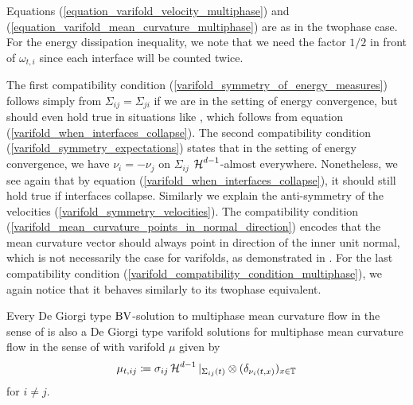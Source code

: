 Equations (\ref{equation_varifold_velocity_multiphase}) and 
(\ref{equation_varifold_mean_curvature_multiphase}) are as in the twophase 
case. For the energy dissipation inequality, we note that we need the factor $ 
1/2 $ in front of $ \omega_{ t , i } $ since each interface will be counted 
twice. 

The first compatibility condition (\ref{varifold_symmetry_of_energy_measures}) 
follows simply from $ \Sigma_{ i j } = \Sigma_{ j i } $ if we are in the 
setting of energy convergence, but should even hold true in situations like 
, which follows from equation 
(\ref{varifold_when_interfaces_collapse}). The second compatibility condition 
(\ref{varifold_symmetry_expectations}) states that in the setting of energy 
convergence, we have $ \nu_{ i } = - \nu_{ j } $ on $ \Sigma_{ i j } $ $ \operatorname{\mathcal{H}}^{ 
d -1 } $-almost everywhere. Nonetheless, we see again that by equation 
(\ref{varifold_when_interfaces_collapse}), it should still hold true if 
interfaces collapse. Similarly we explain the anti-symmetry of the velocities 
(\ref{varifold_symmetry_velocities}). The compatibility condition 
(\ref{varifold_mean_curvature_points_in_normal_direction}) encodes that the 
mean curvature vector should always point in direction of the inner unit 
normal, which is not necessarily the case for varifolds, as demonstrated in 
.
For the last compatibility condition 
(\ref{varifold_compatibility_condition_multiphase}), we again notice that it 
behaves similarly to its twophase equivalent.

\begin{theorem}
	Every  De Giorgi type $ \operatorname{BV} $-solution to multiphase mean curvature 
	flow in the sense of  is also a De Giorgi 
	type varifold solutions for multiphase mean curvature flow in the sense of
	 with varifold $ \mu $ given by
	\begin{equation*}
		\mu_{ t, ij  }
		\coloneqq
		\sigma_{ i j }
		\operatorname{\mathcal{H}}^{ d- 1 }|_{ \Sigma_{ i j } ( t ) }
		\otimes
		( \delta_{ \nu_{ i } ( t, x ) } )_{ x \in \operatorname{\mathbb{T}} }
	\end{equation*} 
	for $ i \neq j $.
\end{theorem}

